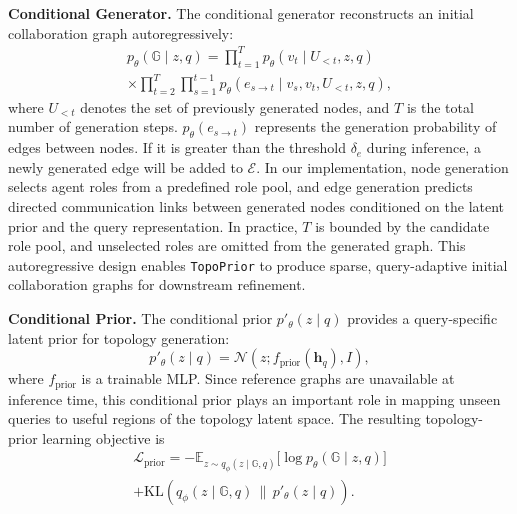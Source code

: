\documentclass[lettersize,journal]{IEEEtran}
\theoremstyle{plain}
\begin{document}
\noindent\textbf{Conditional Generator.}
The conditional generator reconstructs an initial collaboration graph autoregressively:
\begin{multline}
p_\theta(\mathbb{G}\mid z,q)
=
\prod_{t=1}^{T} p_\theta(v_t\mid U_{<t},z,q) \\
\times
\prod_{t=2}^{T}\prod_{s=1}^{t-1}
p_\theta(e_{s\rightarrow t}\mid v_s,v_t,U_{<t},z,q),
\end{multline}
where $U_{<t}$ denotes the set of previously generated nodes, and $T$ is the total number of generation steps.
$p_\theta(e_{s\rightarrow t})$ represents the generation probability of edges between nodes. If it is greater than the threshold $\delta_e$ during inference, a newly generated edge will be added to $\mathcal{E}$.
In our implementation, node generation selects agent roles from a predefined role pool, and edge generation predicts directed communication links between generated nodes conditioned on the latent prior and the query representation. In practice, $T$ is bounded by the candidate role pool, and unselected roles are omitted from the generated graph. This autoregressive design enables \texttt{TopoPrior} to produce sparse, query-adaptive initial collaboration graphs for downstream refinement.

\noindent\textbf{Conditional Prior.}
The conditional prior $p'_\theta(z\mid q)$ provides a query-specific latent prior for topology generation:
\begin{equation}
p'_\theta(z\mid q)=\mathcal{N}\!\left(z;f_{\mathrm{prior}}(\mathbf{h}_q),I\right),
\end{equation}
where $f_{\mathrm{prior}}$ is a trainable MLP. Since reference graphs are unavailable at inference time, this conditional prior plays an important role in mapping unseen queries to useful regions of the topology latent space. The resulting topology-prior learning objective is
\begin{multline}
\mathcal{L}_{\mathrm{prior}}
=
-
\mathbb{E}_{z\sim q_\phi(z\mid \mathbb{G},q)}
\big[\log p_\theta(\mathbb{G}\mid z,q)\big] \\
+
\mathrm{KL}\!\left(q_\phi(z\mid \mathbb{G},q)\,\|\,p'_\theta(z\mid q)\right).
\end{multline}
\end{document}
